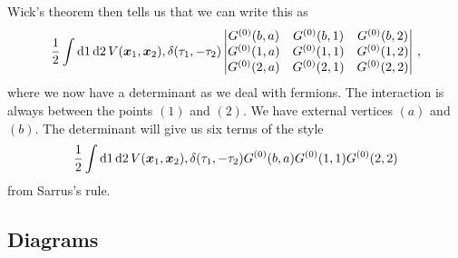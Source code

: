 \documentclass[11pt, english, fleqn, DIV=15, headinclude, BCOR=1cm]{scrartcl}
\begin{document}
Wick's theorem then tells us that we can write this as
\[
    \frac12 \int \dif 1 \dif 2 \, V(\vec x_1, \vec x_2), \delta(\tau_1, -
    \tau_2)
    \begin{vmatrix}
        G^{(0)}(b, a) & G^{(0)}(b, 1) & G^{(0)}(b, 2) \\
        G^{(0)}(1, a) & G^{(0)}(1, 1) & G^{(0)}(1, 2) \\
        G^{(0)}(2, a) & G^{(0)}(2, 1) & G^{(0)}(2, 2) \\
    \end{vmatrix} \,,
\]
where we now have a determinant as we deal with fermions. The interaction is
always between the points $(1)$ and $(2)$. We have external vertices $(a)$ and
$(b)$. The determinant will give us six terms of the style
\[
    \frac12 \int \dif 1 \dif 2 \, V(\vec x_1, \vec x_2), \delta(\tau_1, -
    \tau_2)
    G^{(0)}(b, a)
    G^{(0)}(1, 1)
    G^{(0)}(2, 2)
\]
from Sarrus's rule.

\subsection{Diagrams}
\end{document}
